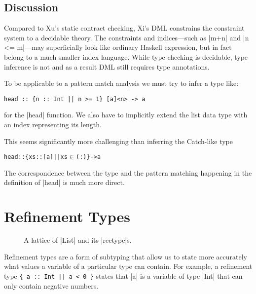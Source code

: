 \subsection{Discussion}
Compared to Xu's static contract checking, Xi's DML constrains the constraint system to a decidable theory. The constraints and indices---such as |m+n| and |n <= m|---may superficially look like ordinary Haskell expression, but in fact belong to a much smaller index language. While type checking is decidable, type inference is not and as a result DML still requires type annotations.

To be applicable to a pattern match analysis we must try to infer a type like:
\begin{verbatim}
head :: {n :: Int || n >= 1} [a]<n> -> a
\end{verbatim}
for the |head| function. We also have to implicitly extend the list data type with an index representing its length.

This seems significantly more challenging than inferring the Catch-like type
\begin{alltt}
head :: \{xs :: [a] || xs \(\in\) (:) \} -> a
\end{alltt}
The correspondence between the type and the pattern matching happening in the definition of |head| is much more direct.

\section{Refinement Types}\label{secrt}

\begin{figure}[t]
\centering
{}
\caption{A lattice of {|List|} and its {|rectype|}s.}
\label{listlattice}
\end{figure}


Refinement types are a form of subtyping that allow us to state more accurately what values a variable of a particular type can contain. For example, a refinement type {\tt \{ a :: Int || a < 0 \}} states that |a| is a variable of type |Int| that can only contain negative numbers.

